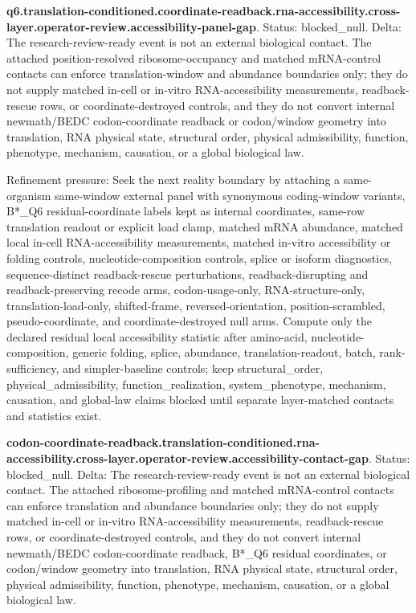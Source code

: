 \textbf{q6.translation-conditioned.coordinate-readback.rna-accessibility.cross-layer.operator-review.accessibility-panel-gap}. Status: blocked\_null. Delta: The research-review-ready event is not an external biological contact. The attached position-resolved ribosome-occupancy and matched mRNA-control contacts can enforce translation-window and abundance boundaries only; they do not supply matched in-cell or in-vitro RNA-accessibility measurements, readback-rescue rows, or coordinate-destroyed controls, and they do not convert internal newmath/BEDC codon-coordinate readback or codon/window geometry into translation, RNA physical state, structural order, physical admissibility, function, phenotype, mechanism, causation, or a global biological law.

Refinement pressure: Seek the next reality boundary by attaching a same-organism same-window external panel with synonymous coding-window variants, B*\_Q6 residual-coordinate labels kept as internal coordinates, same-row translation readout or explicit load clamp, matched mRNA abundance, matched local in-cell RNA-accessibility measurements, matched in-vitro accessibility or folding controls, nucleotide-composition controls, splice or isoform diagnostics, sequence-distinct readback-rescue perturbations, readback-disrupting and readback-preserving recode arms, codon-usage-only, RNA-structure-only, translation-load-only, shifted-frame, reversed-orientation, position-scrambled, pseudo-coordinate, and coordinate-destroyed null arms. Compute only the declared residual local accessibility statistic after amino-acid, nucleotide-composition, generic folding, splice, abundance, translation-readout, batch, rank-sufficiency, and simpler-baseline controls; keep structural\_order, physical\_admissibility, function\_realization, system\_phenotype, mechanism, causation, and global-law claims blocked until separate layer-matched contacts and statistics exist.

\textbf{codon-coordinate-readback.translation-conditioned.rna-accessibility.cross-layer.operator-review.accessibility-contact-gap}. Status: blocked\_null. Delta: The research-review-ready event is not an external biological contact. The attached ribosome-profiling and matched mRNA-control contacts can enforce translation and abundance boundaries only; they do not supply matched in-cell or in-vitro RNA-accessibility measurements, readback-rescue rows, or coordinate-destroyed controls, and they do not convert internal newmath/BEDC codon-coordinate readback, B*\_Q6 residual coordinates, or codon/window geometry into translation, RNA physical state, structural order, physical admissibility, function, phenotype, mechanism, causation, or a global biological law.

